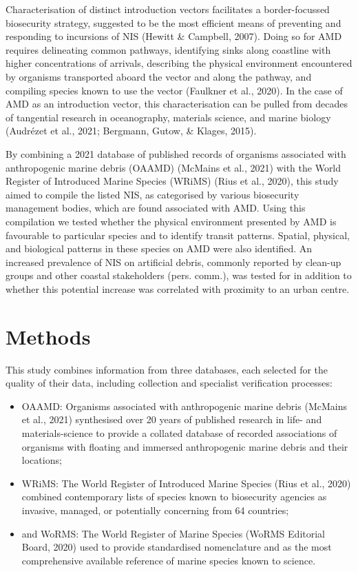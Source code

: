 \documentclass[a4paper, nobind]{templates/ociamthesis}
\providecommand{\tightlist}{%
  \setlength{\itemsep}{0pt}\setlength{\parskip}{0pt}}
\begin{document}
Characterisation of distinct introduction vectors facilitates a border-focussed biosecurity strategy, suggested to be the most efficient means of preventing and responding to incursions of NIS (Hewitt \& Campbell, 2007). Doing so for AMD requires delineating common pathways, identifying sinks along coastline with higher concentrations of arrivals, describing the physical environment encountered by organisms transported aboard the vector and along the pathway, and compiling species known to use the vector (Faulkner et al., 2020). In the case of AMD as an introduction vector, this characterisation can be pulled from decades of tangential research in oceanography, materials science, and marine biology (Audrézet et al., 2021; Bergmann, Gutow, \& Klages, 2015).

By combining a 2021 database of published records of organisms associated with anthropogenic marine debris (OAAMD) (McMains et al., 2021) with the World Register of Introduced Marine Species (WRiMS) (Rius et al., 2020), this study aimed to compile the listed NIS, as categorised by various biosecurity management bodies, which are found associated with AMD. Using this compilation we tested whether the physical environment presented by AMD is favourable to particular species and to identify transit patterns. Spatial, physical, and biological patterns in these species on AMD were also identified. An increased prevalence of NIS on artificial debris, commonly reported by clean-up groups and other coastal stakeholders (pers. comm.), was tested for in addition to whether this potential increase was correlated with proximity to an urban centre.

\hypertarget{methods-1}{%
\section{Methods}\label{methods-1}}

This study combines information from three databases, each selected for the quality of their data, including collection and specialist verification processes:

\begin{itemize}
\tightlist
\item
  OAAMD: Organisms associated with anthropogenic marine debris (McMains et al., 2021) synthesised over 20 years of published research in life- and materials-science to provide a collated database of recorded associations of organisms with floating and immersed anthropogenic marine debris and their locations;
\item
  WRiMS: The World Register of Introduced Marine Species (Rius et al., 2020) combined contemporary lists of species known to biosecurity agencies as invasive, managed, or potentially concerning from 64 countries;
\item
  and WoRMS: The World Register of Marine Species (WoRMS Editorial Board, 2020) used to provide standardised nomenclature and as the most comprehensive available reference of marine species known to science.
\end{itemize}
\end{document}
